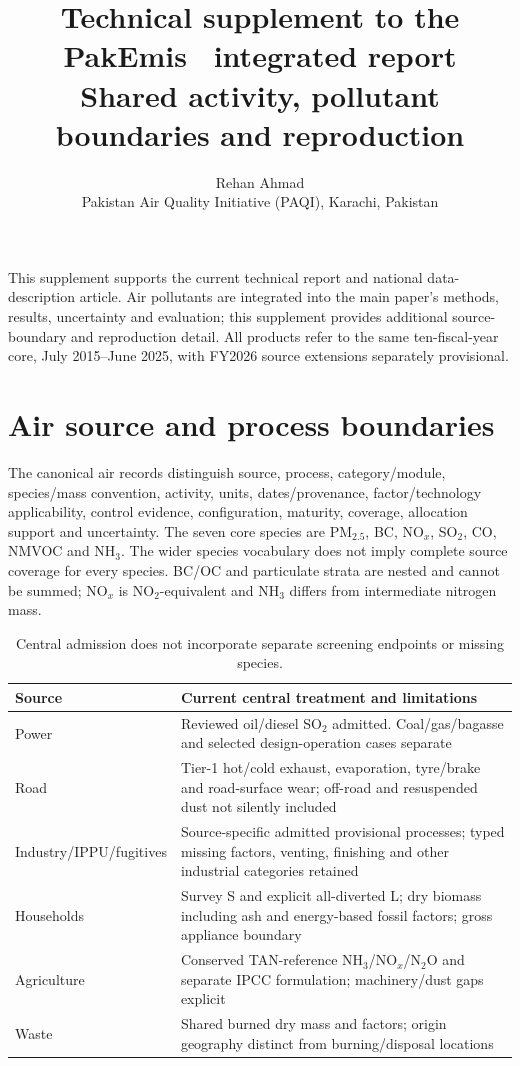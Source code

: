 \documentclass[a4paper,11pt]{article}
\title{Technical supplement to the PakEmis \PakEmisRelease\ integrated report\\[6pt]
\large Shared activity, pollutant boundaries and reproduction}
\author{Rehan Ahmad\\ \small Pakistan Air Quality Initiative (PAQI), Karachi, Pakistan}
\date{}
\begin{document}
\maketitle


\ReleaseCover

This supplement supports the current technical report and national data-description article. Air pollutants are integrated into the main paper's methods, results, uncertainty and evaluation; this supplement provides additional source-boundary and reproduction detail. All products refer to the same ten-fiscal-year core, July 2015--June 2025, with FY2026 source extensions separately provisional.

\section{Air source and process boundaries}\label{sec:airbeta}
The canonical air records distinguish source, process, category/module, species/mass convention, activity, units, dates/provenance, factor/technology applicability, control evidence, configuration, maturity, coverage, allocation support and uncertainty. The seven core species are PM$_{2.5}$, BC, NO$_x$, SO$_2$, CO, NMVOC and NH$_3$. The wider species vocabulary does not imply complete source coverage for every species. BC/OC and particulate strata are nested and cannot be summed; NO$_x$ is NO$_2$-equivalent and NH$_3$ differs from intermediate nitrogen mass.

\begin{table}[htbp]\centering\small
\begin{tabular}{@{}p{.25\linewidth}p{.63\linewidth}@{}}\toprule
Source & Current central treatment and limitations\\\midrule
Power & Reviewed oil/diesel SO$_2$ admitted. Coal/gas/bagasse and selected design-operation cases separate\\
Road & Tier-1 hot/cold exhaust, evaporation, tyre/brake and road-surface wear; off-road and resuspended dust not silently included\\
Industry/IPPU/fugitives & Source-specific admitted provisional processes; typed missing factors, venting, finishing and other industrial categories retained\\
Households & Survey S and explicit all-diverted L; dry biomass including ash and energy-based fossil factors; gross appliance boundary\\
Agriculture & Conserved TAN-reference NH$_3$/NO$_x$/N$_2$O and separate IPCC formulation; machinery/dust gaps explicit\\
Waste & Shared burned dry mass and factors; origin geography distinct from burning/disposal locations\\\bottomrule
\end{tabular}
\caption{Central admission does not incorporate separate screening endpoints or missing species.}\label{tab:air_boundaries}
\end{table}
\end{document}
